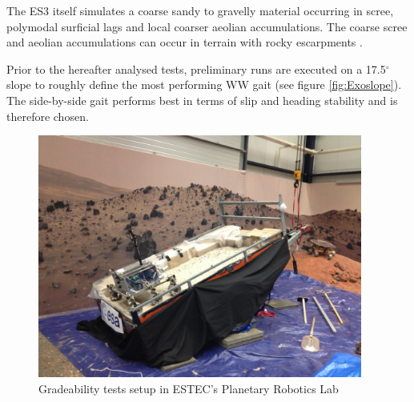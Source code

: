 \documentclass[a4paper,twocolumn]{esapub2005} %
\begin{document}
The ES3 itself simulates a coarse sandy to gravelly material occurring in
scree, polymodal surficial lags and local coarser aeolian accumulations. The
coarse scree and aeolian accumulations can occur in terrain with rocky
escarpments \cite{michaud2014}.




Prior to the hereafter analysed tests, preliminary runs are executed on a
17.5$^{\circ}$ slope to roughly define the most performing WW gait (see figure
\ref{fig:Exoslope}).  The side-by-side gait performs best in terms of slip and
heading stability and is therefore chosen. 

\begin{figure}[h!]
    \centering
    \includegraphics[width=0.95\textwidth]{trailersetup.jpg}
    \caption{Gradeability tests setup in ESTEC's Planetary Robotics Lab}
    \label{fig:trailer}
\end{figure}
\end{document}
